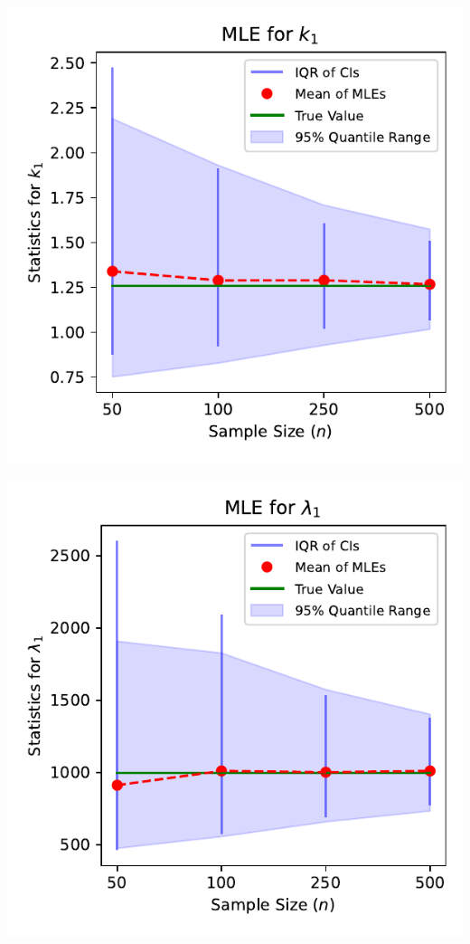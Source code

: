 \documentclass{article}
\begin{document}
\pagestyle{empty}

\noindent
\begin{minipage}[t]{0.45\textwidth}
  \centering
  \includegraphics[width=\textwidth,height=0.33\textheight,keepaspectratio]{plot-n-vs-shape.1.pdf}
\end{minipage}%
\hspace{0.05\textwidth} %
\begin{minipage}[t]{0.45\textwidth}
  \centering
  \includegraphics[width=\textwidth,height=0.33\textheight,keepaspectratio]{plot-n-vs-scale.1.pdf}
\end{minipage}
\end{document}
